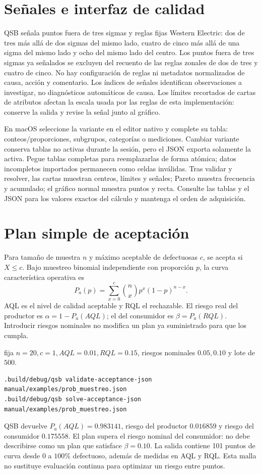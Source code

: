 \section{Señales e interfaz de calidad}
QSB señala puntos fuera de tres sigmas y reglas fijas Western Electric:
dos de tres más allá de dos sigmas del mismo lado, cuatro de cinco más allá
de una sigma del mismo lado y
ocho del mismo lado del centro. Los puntos fuera de tres sigmas ya señalados
se excluyen del recuento de las reglas zonales de dos de tres y cuatro de cinco.
No hay configuración de reglas ni metadatos
normalizados de causa, acción y comentario. Los índices de señales identifican
observaciones a investigar, no diagnósticos automáticos de causa. Los límites
recortados de cartas de atributos afectan la escala usada por las reglas de
esta implementación: conserve la salida y revise la señal junto al gráfico.

En macOS seleccione la variante en el editor nativo y complete su tabla:
conteos/proporciones, subgrupos, categorías o mediciones. Cambiar variante
conserva tablas no activas durante la sesión, pero el JSON exporta solamente la
activa. Pegue tablas completas para reemplazarlas de forma atómica; datos
incompletos importados permanecen como celdas inválidas. Tras validar y resolver,
las cartas muestran centros, límites y señales; Pareto muestra frecuencia y
acumulado; el gráfico normal muestra puntos y recta. Consulte las tablas y el
JSON para los valores exactos del cálculo y mantenga el orden de adquisición.

\section{Plan simple de aceptación}
Para tamaño de muestra \(n\) y máximo aceptable de defectuosas \(c\), se
acepta si \(X\le c\). Bajo muestreo binomial independiente con proporción
\(p\), la curva característica operativa es
\[
 P_a(p)=\sum_{x=0}^c{n\choose x}p^x(1-p)^{n-x}.
\]
AQL es el nivel de calidad aceptable y RQL el rechazable. El riesgo real del
productor es \(\alpha=1-P_a(AQL)\); el del consumidor es
\(\beta=P_a(RQL)\). Introducir riesgos nominales no modifica un plan ya
suministrado para que los cumpla.

 fija \(n=20,c=1,AQL=0.01,RQL=0.15\),
riesgos nominales \(0.05,0.10\) y lote de \(500\).
\begin{lstlisting}
.build/debug/qsb validate-acceptance-json manual/examples/prob_muestreo.json
.build/debug/qsb solve-acceptance-json manual/examples/prob_muestreo.json
\end{lstlisting}
QSB devuelve \(P_a(AQL)=0.983141\), riesgo del productor \(0.016859\)
y riesgo del consumidor \(0.175558\). El plan supera el riesgo nominal del
consumidor: no debe describirse como un plan que satisface \(\beta=0.10\).
La salida contiene 101 puntos de curva desde \(0\) a \(100\%\) defectuoso,
además de medidas en AQL y RQL. Esta malla no sustituye evaluación continua para
optimizar un riesgo entre puntos.

